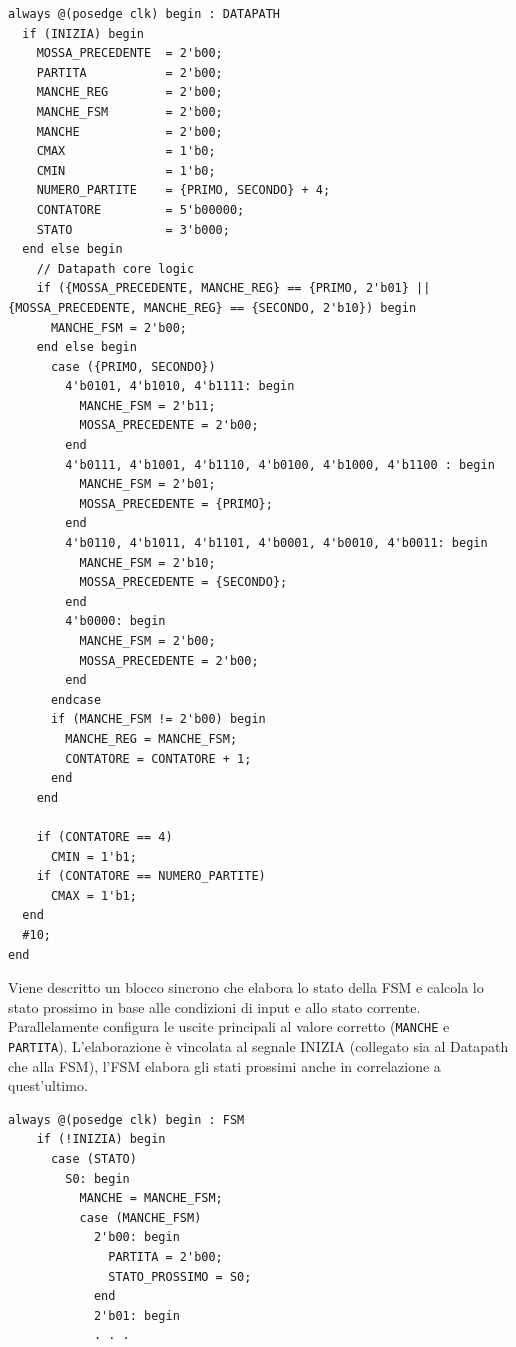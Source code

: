 \documentclass[a4paper]{report}
\begin{document}
\begin{lstlisting}[firstnumber=38]
  always @(posedge clk) begin : DATAPATH
  if (INIZIA) begin
    MOSSA_PRECEDENTE  = 2'b00;
    PARTITA           = 2'b00;
    MANCHE_REG        = 2'b00;
    MANCHE_FSM        = 2'b00;
    MANCHE            = 2'b00;
    CMAX              = 1'b0;
    CMIN              = 1'b0;
    NUMERO_PARTITE    = {PRIMO, SECONDO} + 4;
    CONTATORE         = 5'b00000;  
    STATO             = 3'b000;
  end else begin
    // Datapath core logic
    if ({MOSSA_PRECEDENTE, MANCHE_REG} == {PRIMO, 2'b01} || {MOSSA_PRECEDENTE, MANCHE_REG} == {SECONDO, 2'b10}) begin
      MANCHE_FSM = 2'b00;
    end else begin
      case ({PRIMO, SECONDO}) 
        4'b0101, 4'b1010, 4'b1111: begin
          MANCHE_FSM = 2'b11;
          MOSSA_PRECEDENTE = 2'b00;
        end
        4'b0111, 4'b1001, 4'b1110, 4'b0100, 4'b1000, 4'b1100 : begin
          MANCHE_FSM = 2'b01;
          MOSSA_PRECEDENTE = {PRIMO};
        end
        4'b0110, 4'b1011, 4'b1101, 4'b0001, 4'b0010, 4'b0011: begin
          MANCHE_FSM = 2'b10;
          MOSSA_PRECEDENTE = {SECONDO};
        end
        4'b0000: begin
          MANCHE_FSM = 2'b00;
          MOSSA_PRECEDENTE = 2'b00;
        end
      endcase
      if (MANCHE_FSM != 2'b00) begin
        MANCHE_REG = MANCHE_FSM;
        CONTATORE = CONTATORE + 1;
      end
    end
            
    if (CONTATORE == 4)
      CMIN = 1'b1;
    if (CONTATORE == NUMERO_PARTITE) 
      CMAX = 1'b1;     
  end
  #10;
end

\end{lstlisting}
\vspace{20pt}


Viene descritto un blocco sincrono che elabora lo stato della FSM e calcola lo stato prossimo in base alle condizioni di input e allo stato corrente. Parallelamente configura le uscite principali al valore corretto (\texttt{MANCHE} e \texttt{PARTITA}).
L'elaborazione è vincolata al segnale INIZIA (collegato sia al Datapath che alla FSM), l'FSM elabora gli stati prossimi anche in correlazione a quest'ultimo.
\begin{lstlisting}[firstnumber=87]
  always @(posedge clk) begin : FSM
    if (!INIZIA) begin
      case (STATO)
        S0: begin
          MANCHE = MANCHE_FSM;
          case (MANCHE_FSM)
            2'b00: begin
              PARTITA = 2'b00;
              STATO_PROSSIMO = S0;
            end
            2'b01: begin
            . . .

\end{lstlisting}
\vspace{20pt}
\end{document}
